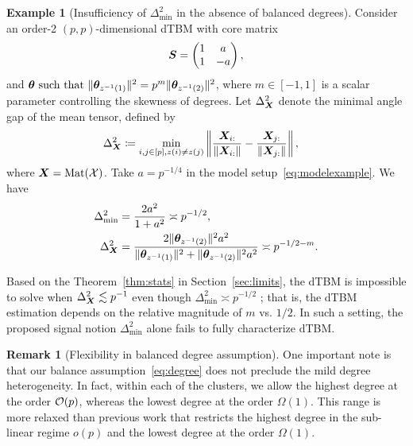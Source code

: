 \documentclass[journal]{IEEEtran}
\theoremstyle{definition}
\theoremstyle{definition}
\newtheorem{example}{Example}
\newtheorem{rmk}{Remark}
\begin{document}
\begin{example}[Insufficiency of $\Delta_{\min}^2$ in the absence of balanced degrees] Consider an order-2 $(p,p)$-dimensional dTBM with core matrix
\begin{equation}\label{eq:modelexample}
    \mS = \begin{pmatrix} 1 &a\\
    1 & -a
    \end{pmatrix}, 
\end{equation}
and $ \boldsymbol{\theta} \text{ such that } \lVert\boldsymbol{\theta}_{z^{-1}(1)}\rVert^2 = p^m \lVert\boldsymbol{\theta}_{z^{-1}(2)}\rVert^2$,
where {$m \in [-1,1]$} is a scalar parameter controlling the skewness of degrees. Let $\Delta_{\bm X}^2$ denote the minimal angle gap of the mean tensor, defined by
\begin{equation}\label{eq:delta_x}
    \Delta_{\mX}^2 \coloneqq \min_{i,j \in [p], z(i) \neq z(j)} \onorm{ \frac{\mX_{i:}}{\onormSize{}{\mX_{i:}}}  -  \frac{\mX_{j:}}{\onormSize{}{\mX_{j:}}}  }, \quad %
\end{equation}
where $ \bm X = \text{Mat}(\mathcal{X})$.
Take $ a = p^{-1/4}$ in the model setup~\eqref{eq:modelexample}. We have 
\begin{align}
    \Delta_{\min}^2 &= \frac{2 a^2}{1 + a^2} \asymp p^{-1/2}, \quad  \\
    \Delta_{\bm X}^2 & = \frac{2\lVert\boldsymbol{\theta}_{z^{-1}(2)}\rVert^{2} a^2}{\lVert\boldsymbol{\theta}_{z^{-1}(1)}\rVert^{2} +  \lVert\boldsymbol{\theta}_{z^{-1}(2)}\rVert^{2}a^2} \asymp p^{-1/2-m}.
\end{align}

{Based on the Theorem~\ref{thm:stats} in Section~\ref{sec:limits}, the dTBM is impossible to solve when $\Delta^2_{\bm X} \lesssim p^{-1}$ even though $\Delta_{\min}^2 \asymp p^{-1/2}$
}; that is, the dTBM estimation depends on the relative magnitude of $m$ vs. $1/2$. In such a setting, the proposed signal notion $\Delta^2_{\min}$ alone fails to fully characterize dTBM. 
\end{example}

\begin{rmk}[Flexibility in balanced degree assumption] One important note is that our balance assumption~\eqref{eq:degree} does not preclude the mild degree heterogeneity. In fact, within each of the clusters, we allow the highest degree at the order $\mathcal{O}(p)$, whereas the lowest degree at the order $\Omega(1)$. This range is more relaxed than previous work \citep{gao2018community} that restricts the highest degree in the sub-linear regime $o(p)$ and the lowest degree at the order $\Omega(1)$. 
\end{rmk}
\end{document}
